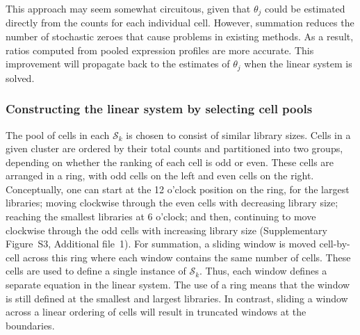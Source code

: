 \documentclass{bmcart}
\newcommand{\suppring}{S3}
\begin{document}
This approach may seem somewhat circuitous, given that $\theta_j$ could be estimated directly from the counts for each individual cell.
However, summation reduces the number of stochastic zeroes that cause problems in existing methods.
As a result, ratios computed from pooled expression profiles are more accurate.
This improvement will propagate back to the estimates of $\theta_j$ when the linear system is solved.

\subsubsection*{Constructing the linear system by selecting cell pools}
The pool of cells in each $\mathcal{S}_{k}$ is chosen to consist of similar library sizes.
Cells in a given cluster are ordered by their total counts and partitioned into two groups, depending on whether the ranking of each cell is odd or even.
These cells are arranged in a ring, with odd cells on the left and even cells on the right.
Conceptually, one can start at the 12 o'clock position on the ring, for the largest libraries; moving clockwise through the even cells with decreasing library size;
reaching the smallest libraries at 6 o'clock; and then, continuing to move clockwise through the odd cells with increasing library size (Supplementary Figure~\suppring{}, Additional file~1).
For summation, a sliding window is moved cell-by-cell across this ring where each window contains the same number of cells.
These cells are used to define a single instance of $\mathcal{S}_{k}$.
Thus, each window defines a separate equation in the linear system.
The use of a ring means that the window is still defined at the smallest and largest libraries.
In contrast, sliding a window across a linear ordering of cells will result in truncated windows at the boundaries.
\end{document}
